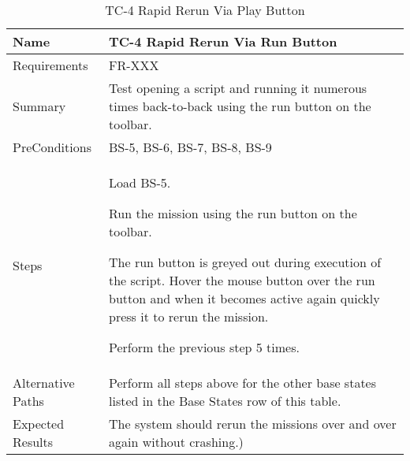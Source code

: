 \begin{table}[htbp!]
\centering
      \begin{tabular}{|p{1.05 in} |p{4.75 in} |}
      \hline
         \rowcolor[rgb]{0.8,0.8,0.8} Name & TC-4 Rapid Rerun Via Run Button\\
         \hline
         Requirements & FR-XXX\\  \hline
         Summary & Test opening a script and running it numerous times back-to-back using the run button on
         the toolbar.\\  \hline
         PreConditions & BS-5, BS-6, BS-7, BS-8, BS-9\\     \hline
         Steps &
         \begin{compactenum}
             \item Load BS-5.
             \item Run the mission using the run button on the toolbar.
             \item The run button is greyed out during execution of the script.  Hover the mouse
             button over the run button and when it becomes active again quickly press it to rerun the mission.
             \item Perform the previous step 5 times.
         \end{compactenum}
         \\ \hline
         Alternative Paths &
         Perform all steps above for the other base states listed in the Base States row of this table.
         \\ \hline
         Expected Results & The system should rerun the missions over and over again without crashing.)\\
      \hline
      \end{tabular}
      \label{Table:TC-4}
      \caption{TC-4 Rapid Rerun Via Play Button}
\end{table} 